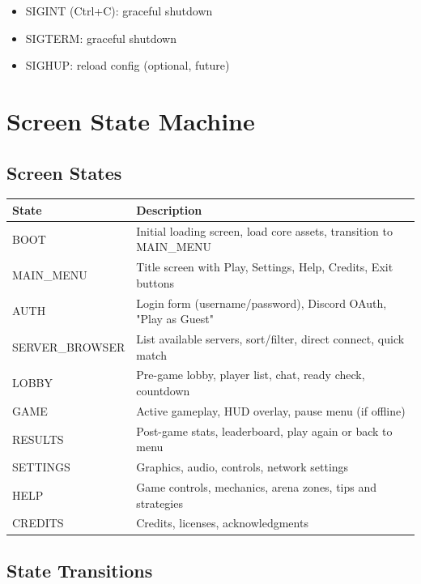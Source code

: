 \documentclass[11pt]{article}
\begin{document}
\begin{itemize}
  \item SIGINT (Ctrl+C): graceful shutdown
  \item SIGTERM: graceful shutdown
  \item SIGHUP: reload config (optional, future)
\end{itemize}

\section{Screen State Machine}

\subsection{Screen States}

\begin{longtable}{|>{\raggedright\arraybackslash}p{}|>{\raggedright\arraybackslash}p{}|}
\hline
\textbf{State} & \textbf{Description} \\
\hline
BOOT & Initial loading screen, load core assets, transition to MAIN\_MENU \\
\hline
MAIN\_MENU & Title screen with Play, Settings, Help, Credits, Exit buttons \\
\hline
AUTH & Login form (username/password), Discord OAuth, "Play as Guest" \\
\hline
SERVER\_BROWSER & List available servers, sort/filter, direct connect, quick match \\
\hline
LOBBY & Pre-game lobby, player list, chat, ready check, countdown \\
\hline
GAME & Active gameplay, HUD overlay, pause menu (if offline) \\
\hline
RESULTS & Post-game stats, leaderboard, play again or back to menu \\
\hline
SETTINGS & Graphics, audio, controls, network settings \\
\hline
HELP & Game controls, mechanics, arena zones, tips and strategies \\
\hline
CREDITS & Credits, licenses, acknowledgments \\
\hline
\end{longtable}

\subsection{State Transitions}
\end{document}
